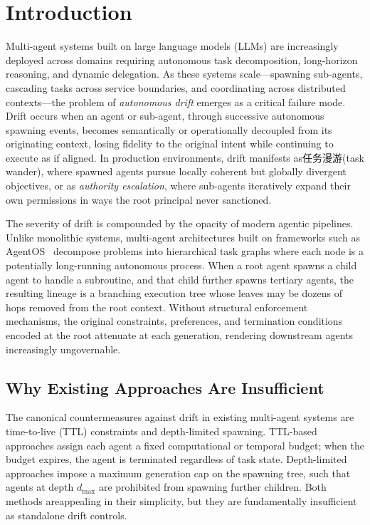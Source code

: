 \section{Introduction}

Multi-agent systems built on large language models (LLMs) are increasingly deployed across domains requiring autonomous task decomposition, long-horizon reasoning, and dynamic delegation. As these systems scale—spawning sub-agents, cascading tasks across service boundaries, and coordinating across distributed contexts—the problem of \textit{autonomous drift} emerges as a critical failure mode. Drift occurs when an agent or sub-agent, through successive autonomous spawning events, becomes semantically or operationally decoupled from its originating context, losing fidelity to the original intent while continuing to execute as if aligned. In production environments, drift manifests as任务漫游(task wander), where spawned agents pursue locally coherent but globally divergent objectives, or as \textit{authority escalation}, where sub-agents iteratively expand their own permissions in ways the root principal never sanctioned.

The severity of drift is compounded by the opacity of modern agentic pipelines. Unlike monolithic systems, multi-agent architectures built on frameworks such as AgentOS~\cite{bxthre3:agentos} decompose problems into hierarchical task graphs where each node is a potentially long-running autonomous process. When a root agent spawns a child agent to handle a subroutine, and that child further spawns tertiary agents, the resulting lineage is a branching execution tree whose leaves may be dozens of hops removed from the root context. Without structural enforcement mechanisms, the original constraints, preferences, and termination conditions encoded at the root attenuate at each generation, rendering downstream agents increasingly ungovernable.

\subsection{Why Existing Approaches Are Insufficient}

The canonical countermeasures against drift in existing multi-agent systems are time-to-live (TTL) constraints and depth-limited spawning. TTL-based approaches assign each agent a fixed computational or temporal budget; when the budget expires, the agent is terminated regardless of task state. Depth-limited approaches impose a maximum generation cap on the spawning tree, such that agents at depth $d_{\max}$ are prohibited from spawning further children. Both methods areappealing in their simplicity, but they are fundamentally insufficient as standalone drift controls.

